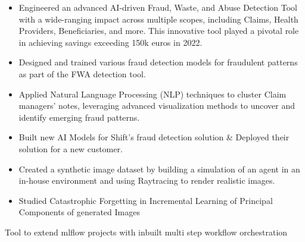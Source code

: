 \documentclass[10pt,letter,ragged2e,withhyper]{altacv}
\renewcommand{\divider}{\textcolor{body!30}{\hdashrule{\linewidth}{0.6pt}{0.5ex}}\medskip}
\begin{document}
\begin{paracol}{2}
\begin{itemize}
  \item Engineered an advanced AI-driven Fraud, Waste, and Abuse Detection Tool with a wide-ranging impact across multiple scopes, including Claims, Health Providers, Beneficiaries, and more. This innovative tool played a pivotal role in achieving savings exceeding 150k euros in 2022.
  \item Designed and trained various fraud detection models for fraudulent patterns as part of the FWA detection tool.
\end{itemize}

\divider
{}

\begin{itemize}
  \item Applied Natural Language Processing (NLP) techniques to cluster Claim managers' notes, leveraging advanced visualization methods to uncover and identify emerging fraud patterns.
  \item Built new AI Models for Shift's fraud detection solution \& Deployed their solution for a new customer.
\end{itemize}

\divider
{}

\begin{itemize}
  \item Created a synthetic image dataset by building a simulation of an agent in an in-house environment and using Raytracing to render realistic images.
  \item Studied Catastrophic Forgetting in Incremental Learning of Principal Components of generated Images
\end{itemize}





Tool to extend mlflow projects with inbuilt multi step workflow orchestration


\divider
{}


\end{paracol}
\end{document}
